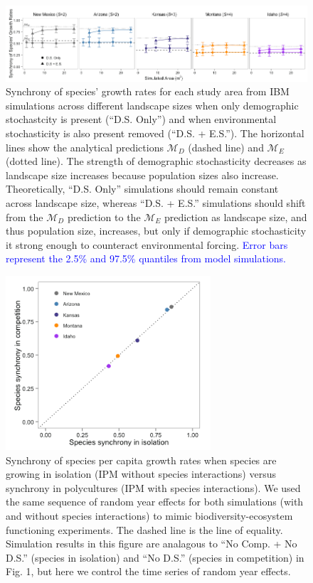 \documentclass[12pt,]{article}
\begin{document}
\begin{figure}[!ht]
  \centering
      \includegraphics[width=6in]{./components/formatted_figures/formatted_figure2.png}
  \caption{Synchrony of species' growth rates for each study area from IBM simulations across different landscape sizes when only demographic stochastcity is present (``D.S. Only'') and when environmental stochasticity is also present removed (``D.S. + E.S.''). The horizontal lines show the analytical predictions $\mathcal{M}_D$ (dashed line) and $\mathcal{M}_E$ (dotted line). The strength of demographic stochasticity decreases as landscape size increases because population sizes also increase. Theoretically, ``D.S. Only'' simulations should remain constant across landscape size, whereas ``D.S. + E.S.'' simulations should shift from the $\mathcal{M}_D$ prediction to the $\mathcal{M}_E$ prediction as landscape size, and thus population size, increases, but only if demographic stochasticity it strong enough to counteract environmental forcing. \textcolor{blue}{Error bars represent the 2.5\% and 97.5\% quantiles from model simulations.}}
\end{figure}

\pagebreak{}

\begin{figure}[!ht]
  \centering
      \includegraphics[width=3in]{./components/formatted_figures/formatted_figure3.png}
  \caption{Synchrony of species per capita growth rates when species are growing in isolation (IPM without species interactions) versus synchrony in polycultures (IPM with species interactions). We used the same sequence of random year effects for both simulations (with and without species interactions) to mimic biodiversity-ecosystem functioning experiments. The dashed line is the line of equality. Simulation results in this figure are analagous to ``No Comp. + No D.S.'' (species in isolation) and ``No D.S.'' (species in competition) in Fig. 1, but here we control the time series of random year effects.}
\end{figure}
\end{document}
